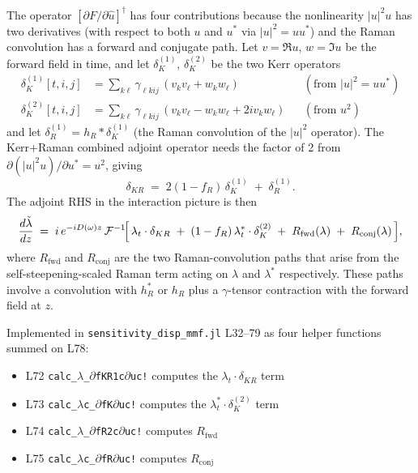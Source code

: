 \documentclass[11pt]{article}
\providecommand{\dv}[2]{\frac{d #1}{d #2}}
\newcommand{\uhat}{\hat{u}}
\begin{document}
The operator $[\partial F/\partial \uhat]^\dagger$ has four contributions
because the nonlinearity $|u|^2 u$ has two derivatives (with respect to both $u$
and $u^*$ via $|u|^2 = u u^*$) and the Raman convolution has a forward and
conjugate path. Let $v = \Re u$, $w = \Im u$ be the forward field in time, and
let $\delta_K^{(1)}$, $\delta_K^{(2)}$ be the two Kerr operators
\begin{align}
  \delta_K^{(1)}[t,i,j] &= \sum_{k\ell} \gamma_{\ell k i j}\,(v_k v_\ell + w_k w_\ell)
      &&(\text{from } |u|^2 = u u^*) \label{eq:delta1}\\
  \delta_K^{(2)}[t,i,j] &= \sum_{k\ell} \gamma_{\ell k i j}\,(v_k v_\ell - w_k w_\ell + 2i v_k w_\ell)
      &&(\text{from } u^2) \label{eq:delta2}
\end{align}
and let $\delta_R^{(1)} = h_R \ast \delta_K^{(1)}$ (the Raman convolution of the
$|u|^2$ operator). The Kerr+Raman combined adjoint operator needs the factor
of 2 from $\partial(|u|^2 u)/\partial u^* = u^2$, giving
\begin{equation}
  \delta_{KR} \;=\; 2(1-f_R)\,\delta_K^{(1)} \;+\; \delta_R^{(1)}.
  \label{eq:deltaKR}
\end{equation}
The adjoint RHS in the interaction picture is then
\begin{equation}
  \dv{\tilde{\lambda}}{z}
  \;=\; i\,e^{-iD(\omega)z}\,\mathcal{F}^{-1}\!\Bigl[\,
          \lambda_t \cdot \delta_{KR}
          \;+\; (1-f_R)\,\lambda^*_t \cdot \delta_K^{(2)}
          \;+\; R_\text{fwd}(\lambda)
          \;+\; R_\text{conj}(\lambda)
        \,\Bigr],
  \label{eq:adjoint_rhs}
\end{equation}
where $R_\text{fwd}$ and $R_\text{conj}$ are the two Raman-convolution paths
that arise from the self-steepening-scaled Raman term acting on $\lambda$ and
$\lambda^*$ respectively. These paths involve a convolution with $h_R^*$ or
$h_R$ plus a $\gamma$-tensor contraction with the forward field at $z$.

Implemented in \texttt{sensitivity\_disp\_mmf.jl} L32--79 as four helper
functions summed on L78:
\begin{itemize}
\item L72 \texttt{calc\_$\lambda$\_$\partial$fKR1c$\partial$uc!} computes the
  $\lambda_t \cdot \delta_{KR}$ term
\item L73 \texttt{calc\_$\lambda$c\_$\partial$fK$\partial$uc!} computes the
  $\lambda^*_t \cdot \delta_K^{(2)}$ term
\item L74 \texttt{calc\_$\lambda$\_$\partial$fR2c$\partial$uc!} computes $R_\text{fwd}$
\item L75 \texttt{calc\_$\lambda$c\_$\partial$fR$\partial$uc!} computes $R_\text{conj}$
\end{itemize}
\end{document}
